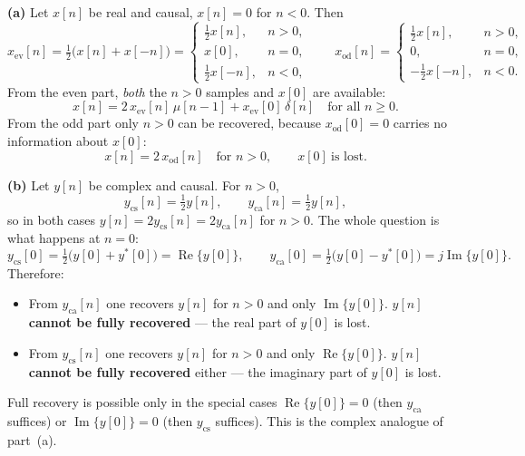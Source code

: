
\textbf{(a)} Let $x[n]$ be real and causal, $x[n]=0$ for $n<0$. Then
\[
x_{\mathrm{ev}}[n]=\tfrac12\bigl(x[n]+x[-n]\bigr)=
\begin{cases}
\tfrac12 x[n], & n>0,\\
x[0], & n=0,\\
\tfrac12 x[-n], & n<0,
\end{cases}
\qquad
x_{\mathrm{od}}[n]=
\begin{cases}
\tfrac12 x[n], & n>0,\\
0, & n=0,\\
-\tfrac12 x[-n], & n<0 .
\end{cases}
\]
From the even part, \emph{both} the $n>0$ samples and $x[0]$ are available:
\[
\boxed{\;x[n]=2\,x_{\mathrm{ev}}[n]\,\mu[n-1]+x_{\mathrm{ev}}[0]\,\delta[n]\quad\text{for all }n\ge 0 .\;}
\]
From the odd part only $n>0$ can be recovered, because $x_{\mathrm{od}}[0]=0$ carries no
information about $x[0]$:
\[
\boxed{\;x[n]=2\,x_{\mathrm{od}}[n]\quad\text{for }n>0,\qquad x[0]\ \text{is lost.}\;}
\]

\textbf{(b)} Let $y[n]$ be complex and causal. For $n>0$,
\[
y_{\mathrm{cs}}[n]=\tfrac12 y[n],\qquad y_{\mathrm{ca}}[n]=\tfrac12 y[n],
\]
so in both cases $y[n]=2y_{\mathrm{cs}}[n]=2y_{\mathrm{ca}}[n]$ for $n>0$. The whole question
is what happens at $n=0$:
\[
y_{\mathrm{cs}}[0]=\tfrac12\bigl(y[0]+y^*[0]\bigr)=\operatorname{Re}\{y[0]\},\qquad
y_{\mathrm{ca}}[0]=\tfrac12\bigl(y[0]-y^*[0]\bigr)=j\operatorname{Im}\{y[0]\}.
\]
Therefore:
\begin{itemize}[leftmargin=1.4em,itemsep=1pt]
\item From $y_{\mathrm{ca}}[n]$ one recovers $y[n]$ for $n>0$ and only
      $\operatorname{Im}\{y[0]\}$. \textbf{$y[n]$ cannot be fully recovered} --- the real part
      of $y[0]$ is lost.
\item From $y_{\mathrm{cs}}[n]$ one recovers $y[n]$ for $n>0$ and only
      $\operatorname{Re}\{y[0]\}$. \textbf{$y[n]$ cannot be fully recovered} either --- the
      imaginary part of $y[0]$ is lost.
\end{itemize}
Full recovery is possible only in the special cases $\operatorname{Re}\{y[0]\}=0$
(then $y_{\mathrm{ca}}$ suffices) or $\operatorname{Im}\{y[0]\}=0$ (then $y_{\mathrm{cs}}$
suffices). This is the complex analogue of part~(a).


